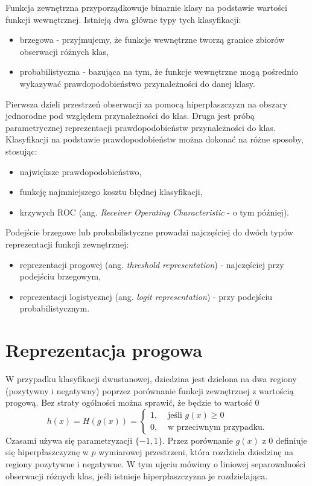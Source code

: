 \documentclass[]{book}
\providecommand{\tightlist}{%
  \setlength{\itemsep}{0pt}\setlength{\parskip}{0pt}}
\theoremstyle{plain}
\theoremstyle{definition}
\theoremstyle{definition}
\theoremstyle{definition}
\theoremstyle{definition}
\theoremstyle{remark}
\begin{document}
Funkcja zewnętrzna przyporządkowuje binarnie klasy na podstawie wartości funkcji wewnętrznej. Istnieją dwa główne typy tych klasyfikacji:

\begin{itemize}
\tightlist
\item
  brzegowa - przyjmujemy, że funkcje wewnętrzne tworzą granice zbiorów obserwacji różnych klas,
\item
  probabilistyczna - bazująca na tym, że funkcje wewnętrzne mogą pośrednio wykazywać prawdopodobieństwo przynależności do danej klasy.
\end{itemize}

Pierwsza dzieli przestrzeń obserwacji za pomocą hiperpłaszczyzn na obszary jednorodne pod względem przynależności do klas. Druga jest próbą parametrycznej reprezentacji prawdopodobieństw przynależności do klas. Klasyfikacji na podstawie prawdopodobieństw można dokonać na różne sposoby, stosując:

\begin{itemize}
\tightlist
\item
  największe prawdopodobieństwo,
\item
  funkcję najmniejszego kosztu błędnej klasyfikacji,
\item
  krzywych ROC (ang. \emph{Receiver Operating Characteristic} - o tym później).
\end{itemize}

Podejście brzegowe lub probabilistyczne prowadzi najczęściej do dwóch typów reprezentacji funkcji zewnętrznej:

\begin{itemize}
\tightlist
\item
  reprezentacji progowej (ang. \emph{threshold representation}) - najczęściej przy podejściu brzegowym,
\item
  reprezentacji logistycznej (ang. \emph{logit representation}) - przy podejściu probabilistycznym.
\end{itemize}

\hypertarget{reprezentacja-progowa}{%
\section{Reprezentacja progowa}\label{reprezentacja-progowa}}

W przypadku klasyfikacji dwustanowej, dziedzina jest dzielona na dwa regiony (pozytywny i negatywny) poprzez porównanie funkcji zewnętrznej z wartością progową. Bez straty ogólności można sprawić, że będzie to wartość 0
\begin{equation}
    h(x)=H(g(x))= \begin{cases}
        1, &\text{ jeśli } g(x)\geq 0\\
        0, &\text{ w przeciwnym przypadku.}
    \end{cases}
\end{equation}
Czasami używa się parametryzacji \(\{-1,1\}\).
Przez porównanie \(g(x)\) z 0 definiuje się hiperpłaszczyznę w \(p\) wymiarowej przestrzeni, która rozdziela dziedzinę na regiony pozytywne i negatywne. W tym ujęciu mówimy o liniowej separowalności obserwacji różnych klas, jeśli istnieje hiperpłaszczyzna je rozdzielająca.
\end{document}

